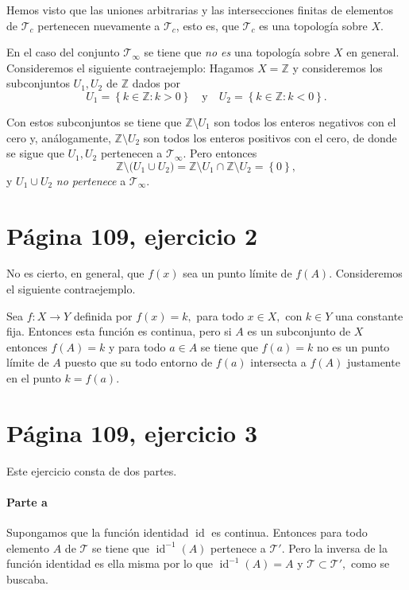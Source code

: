 \documentclass[mid,fleqn,final,oneside]{tareas}
\DeclareMathOperator{\id}{id}
\begin{document}
Hemos visto que las uniones arbitrarias y las
intersecciones finitas de elementos de $\mathcal{T}_c$
pertenecen nuevamente a $\mathcal{T}_c$, esto es, que
$\mathcal{T}_c$ es una topología sobre $X$.

En el caso del conjunto $ \mathcal{T}_\infty $ se tiene
que \emph{no es} una topología sobre $ X $ en general.
Consideremos el siguiente contraejemplo: Hagamos $
X=\mathbb{Z} $ y consideremos los subconjuntos $
U_1,U_2 $ de
$ \mathbb{Z} $ dados por
\[
	U_1= \left\{ k\in\mathbb{Z}\colon k>0 \right\}
	\quad\text{y}\quad 
	U_2=\left\{ k\in\mathbb{Z}\colon k<0 \right\}.
\]

\reversemarginpar{}
Con estos subconjuntos se tiene que
$\mathbb{Z}\setminus U_1$ son todos los enteros
negativos con el cero y, análogamente, $
\mathbb{Z}\setminus U_2 $ son todos los enteros
positivos con el cero, de donde se sigue que $ U_1,U_2
$ pertenecen a $ \mathcal{T}_\infty $. Pero entonces
\[
	\mathbb{Z}\setminus \big(U_1\cup U_2\big)= 
	\mathbb{Z}\setminus U_1\cap \mathbb{Z}\setminus U_2 
		= \left\{ 0 \right\},
\]
y $ U_1\cup U_2 $ \emph{no pertenece} a $ \mathcal{T}_\infty $.

\section*{Página 109, ejercicio 2}

No es cierto, en general, que $ f(x) $ sea un punto
límite de $ f(A) $. Consideremos el siguiente
contraejemplo.

\normalmarginpar{}
Sea $ f\colon X\to Y $ definida por $ f(x)=k, $ para
todo $x\in X,$ con $ k\in Y $ una constante fija.
Entonces esta función es continua, pero si $ A $ es un
subconjunto de $ X $ entonces $ f(A)=k $ y para todo $
a\in A $ se tiene que $ f(a)=k $ no es un punto límite
de $ A $ puesto que su todo entorno de $ f(a) $
intersecta a $ f(A) $ justamente en el punto $ k=f(a). $

\section*{Página 109, ejercicio 3}

Este ejercicio consta de dos partes.

\paragraph{Parte a}%
Supongamos que la función identidad $ \id $ es continua.
Entonces para todo elemento $ A $ de $ \mathcal{T} $
se tiene que $ \id^{-1}(A) $ pertenece a $ \mathcal{T}'.
$ Pero la inversa de la función identidad es ella
misma por lo que $ \id^{-1}(A)=A $ y $
\mathcal{T}\subset\mathcal{T}', $ como se buscaba.
\end{document}
